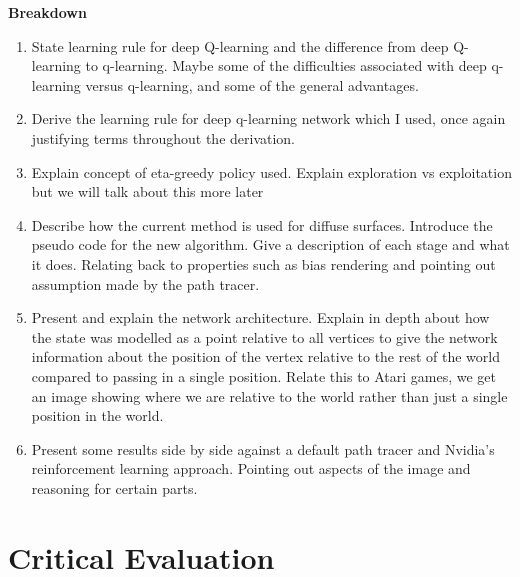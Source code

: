 \documentclass[ %
                    author={Callum Pearce},
                supervisor={Dr. Neill Campbell},
                    degree={MEng},
                     title={How effective are Temporal difference learning methods for reducing the number of zero contribution light paths, while still accurately approximating Global Illumination in Path tracing?},
                  subtitle={},
                      type={research},
                      year={2019} ]{dissertation}
\begin{document}

\textbf{Breakdown}
\begin{enumerate}

\item State learning rule for deep Q-learning and the difference from deep Q-learning to q-learning. Maybe some of the difficulties associated with deep q-learning versus q-learning, and some of the general advantages. 

\item Derive the learning rule for deep q-learning network which I used, once again justifying terms throughout the derivation.

\item Explain concept of eta-greedy policy used. Explain exploration vs exploitation but we will talk about this more later

\item Describe how the current method is used for diffuse surfaces. Introduce the pseudo code for the new algorithm. Give a description of each stage and what it does. Relating back to properties such as bias rendering and pointing out assumption made by the path tracer.

\item Present and explain the network architecture. Explain in depth about how the state was modelled as a point relative to all vertices to give the network information about the position of the vertex relative to the rest of the world compared to passing in a single position. Relate this to Atari games, we get an image showing where we are relative to the world rather than just a single position in the world.

\item Present some results side by side against a default path tracer and Nvidia's reinforcement learning approach. Pointing out aspects of the image and reasoning for certain parts.

\end{enumerate}


\chapter{Critical Evaluation}
\label{chap:evaluation}
\end{document}
